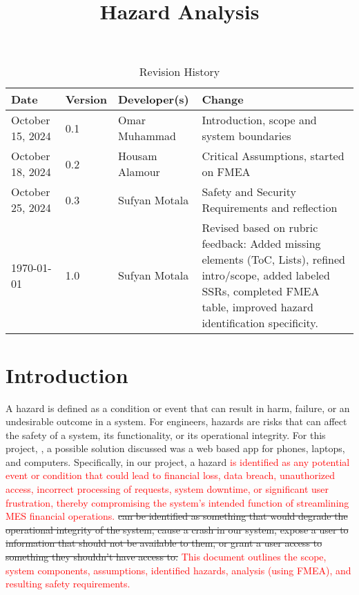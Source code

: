 \documentclass{article}
\title{Hazard Analysis\\\progname}
\author{\authname}
\date{}
\begin{document}
\maketitle
\thispagestyle{empty}

\newpage

\tableofcontents
\listoftables
\listoffigures

\newpage

\begin{table}[hp]
\caption{Revision History} \label{TblRevisionHistory}
\begin{tabularx}{\textwidth}{lllX}
\toprule
\textbf{Date} & \textbf{Version} & \textbf{Developer(s)} & \textbf{Change}\\
\midrule
October 15, 2024 & 0.1 & Omar Muhammad & Introduction, scope and system boundaries\\
October 18, 2024 & 0.2 & Housam Alamour & Critical Assumptions, started on FMEA\\
October 25, 2024 & 0.3 & Sufyan Motala & Safety and Security Requirements and reflection\\
\today & 1.0 & Sufyan Motala & Revised based on rubric feedback: Added missing elements (ToC, Lists), refined intro/scope, added labeled SSRs, completed FMEA table, improved hazard identification specificity. \\
\bottomrule
\end{tabularx}
\end{table}

\newpage


\section{Introduction}

A hazard is defined as a condition or event that can result in harm, failure, or an undesirable outcome in a system. For engineers, hazards are risks that can affect the safety of a system, its functionality, or its operational integrity. For this project, \progname{}, a possible solution discussed was a web based app for phones, laptops, and computers. Specifically, in our project, a hazard \textcolor{red}{is identified as any potential event or condition that could lead to financial loss, data breach, unauthorized access, incorrect processing of requests, system downtime, or significant user frustration, thereby compromising the system's intended function of streamlining MES financial operations.} \sout{can be identified as something that would degrade the operational integrity of the system, cause a crash in our system, expose a user to information that should not be available to them, or grant a user access to something they shouldn't have access to.} \textcolor{red}{This document outlines the scope, system components, assumptions, identified hazards, analysis (using FMEA), and resulting safety requirements.}
\end{document}
